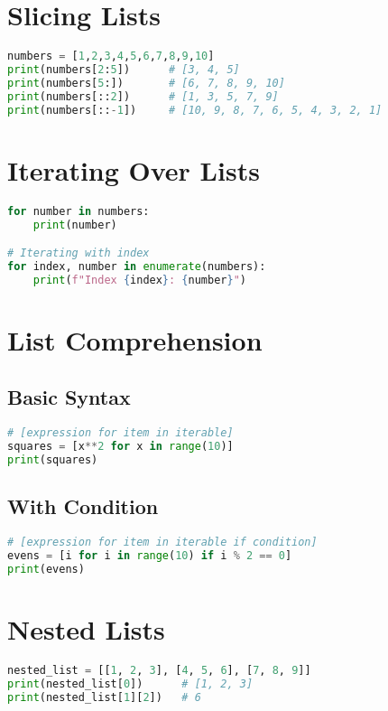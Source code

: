 \section{Slicing Lists}

\begin{lstlisting}[language=Python]
numbers = [1,2,3,4,5,6,7,8,9,10]
print(numbers[2:5])      # [3, 4, 5]
print(numbers[5:])       # [6, 7, 8, 9, 10]
print(numbers[::2])      # [1, 3, 5, 7, 9]
print(numbers[::-1])     # [10, 9, 8, 7, 6, 5, 4, 3, 2, 1]
\end{lstlisting}

\section{Iterating Over Lists}

\begin{lstlisting}[language=Python]
for number in numbers:
    print(number)

# Iterating with index
for index, number in enumerate(numbers):
    print(f"Index {index}: {number}")
\end{lstlisting}

\section{List Comprehension}

\subsection{Basic Syntax}
\begin{lstlisting}[language=Python]
# [expression for item in iterable]
squares = [x**2 for x in range(10)]
print(squares)
\end{lstlisting}

\subsection{With Condition}
\begin{lstlisting}[language=Python]
# [expression for item in iterable if condition]
evens = [i for i in range(10) if i % 2 == 0]
print(evens)
\end{lstlisting}

\section{Nested Lists}

\begin{lstlisting}[language=Python]
nested_list = [[1, 2, 3], [4, 5, 6], [7, 8, 9]]
print(nested_list[0])      # [1, 2, 3]
print(nested_list[1][2])   # 6
\end{lstlisting}

